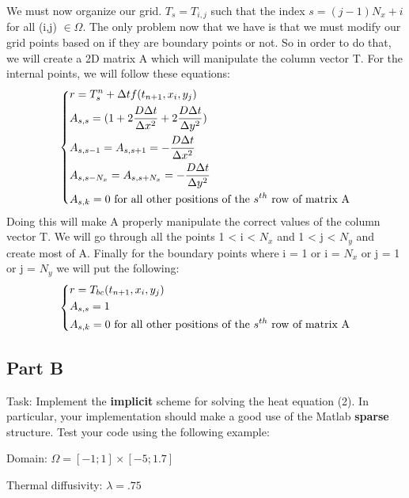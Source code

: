 \documentclass[12pt]{article}
\begin{document}
We must now organize our grid. $T_s = T_{i,j}$ such that the index $s = (j-1)N_x + i$ for all (i,j) $\in \Omega$. The only problem now that we have is that we must modify our grid points based on if they are boundary points or not. So in order to do that, we will create a 2D matrix A which will manipulate the column vector T. For the internal points, we will follow these equations:
\begin{equation}
\begin{dcases}
r = T^n_s + \Delta t f(t_{n+1},x_i,y_j)\\
A_{s,s} = (1 + 2\frac{D\Delta t}{\Delta x^2} + 2\frac{D\Delta t}{\Delta y^2})\\
A_{s,s-1} = A_{s,s+1} = -\frac{D\Delta t}{\Delta x^2}\\
A_{s,s-N_x} = A_{s,s+N_x} = -\frac{D\Delta t}{\Delta y^2}\\
A_{s,k} = 0 \textrm{ for all other positions of the $s^{th}$ row of matrix A}
\end{dcases}
\end{equation}
Doing this will make A properly manipulate the correct values of the column vector T. We will go through all the points 1 < i < $N_x$ and 1 < j < $N_y$ and create most of A. Finally for the boundary points where i = 1 or i = $N_x$ or j = 1 or j = $N_y$ we will put the following:
\begin{equation}
\begin{dcases}
r = T_{bc}(t_{n+1},x_i,y_j) \\
A_{s,s} = 1 \\
A_{s,k} = 0 \textrm{ for all other positions of the $s^{th}$ row of matrix A}
\end{dcases}
\end{equation}

\subsection*{Part B}
Task: Implement the \textbf{implicit} scheme for solving the heat equation (2). In particular, your implementation should make a good use of the Matlab \textbf{sparse} structure. Test your code using the following example:

\hspace{4.2cm}Domain:\hspace{2.2cm} $\Omega = [-1;1] \times [-5;1.7]$

\hspace{2.15cm}Thermal diffusivity: \hspace{2cm} $\lambda = .75$
\end{document}
